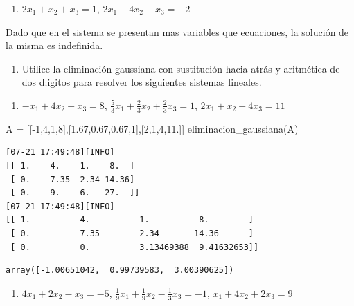 \documentclass[
  letterpaper,
  DIV=11,
  numbers=noendperiod]{scrartcl}
\newenvironment{Shaded}{\begin{snugshade}}{\end{snugshade}}
\newcommand{\DecValTok}[1]{\textcolor[rgb]{0.68,0.00,0.00}{#1}}
\newcommand{\FloatTok}[1]{\textcolor[rgb]{0.68,0.00,0.00}{#1}}
\newcommand{\NormalTok}[1]{\textcolor[rgb]{0.00,0.23,0.31}{#1}}
\newcommand{\OperatorTok}[1]{\textcolor[rgb]{0.37,0.37,0.37}{#1}}
\providecommand{\tightlist}{%
  \setlength{\itemsep}{0pt}\setlength{\parskip}{0pt}}\usepackage{longtable,booktabs,array}
\begin{document}
\begin{enumerate}
\def\labelenumi{\alph{enumi}.}
\setcounter{enumi}{3}
\tightlist
\item
  \(2x_1 + x_2 + x_3 = 1\), \(2x_1 + 4x_2 - x_3 = -2\)
\end{enumerate}

Dado que en el sistema se presentan mas variables que ecuaciones, la
solución de la misma es indefinida.

\begin{enumerate}
\def\labelenumi{\arabic{enumi}.}
\setcounter{enumi}{1}
\tightlist
\item
  Utilice la eliminación gaussiana con sustitución hacia atrás y
  aritmética de dos d;igitos para resolver los siguientes sistemas
  lineales.
\end{enumerate}

\begin{enumerate}
\def\labelenumi{\alph{enumi}.}
\tightlist
\item
  \(-x_1 + 4x_2 + x_3 = 8\),
  \(\frac{5}{3}x_1 + \frac{2}{3}x_2 +\frac{2}{3}x_3 = 1\),
  \(2x_1 + x_2 +4x_3 = 11\)
\end{enumerate}

\begin{Shaded}
\begin{Highlighting}[]
\NormalTok{A }\OperatorTok{=}\NormalTok{ [[}\OperatorTok{{-}}\DecValTok{1}\NormalTok{,}\DecValTok{4}\NormalTok{,}\DecValTok{1}\NormalTok{,}\DecValTok{8}\NormalTok{],[}\FloatTok{1.67}\NormalTok{,}\FloatTok{0.67}\NormalTok{,}\FloatTok{0.67}\NormalTok{,}\DecValTok{1}\NormalTok{],[}\DecValTok{2}\NormalTok{,}\DecValTok{1}\NormalTok{,}\DecValTok{4}\NormalTok{,}\FloatTok{11.}\NormalTok{]]}
\NormalTok{eliminacion\_gaussiana(A)}
\end{Highlighting}
\end{Shaded}

\begin{verbatim}
[07-21 17:49:48][INFO] 
[[-1.    4.    1.    8.  ]
 [ 0.    7.35  2.34 14.36]
 [ 0.    9.    6.   27.  ]]
[07-21 17:49:48][INFO] 
[[-1.          4.          1.          8.        ]
 [ 0.          7.35        2.34       14.36      ]
 [ 0.          0.          3.13469388  9.41632653]]
\end{verbatim}

\begin{verbatim}
array([-1.00651042,  0.99739583,  3.00390625])
\end{verbatim}

\begin{enumerate}
\def\labelenumi{\alph{enumi}.}
\setcounter{enumi}{1}
\tightlist
\item
  \(4x_1 + 2x_2 - x_3 = -5\),
  \(\frac{1}{9}x_1 + \frac{1}{9}x_2 -\frac{1}{3}x_3 = -1\),
  \(x_1 + 4x_2 +2x_3 = 9\)
\end{enumerate}
\end{document}
